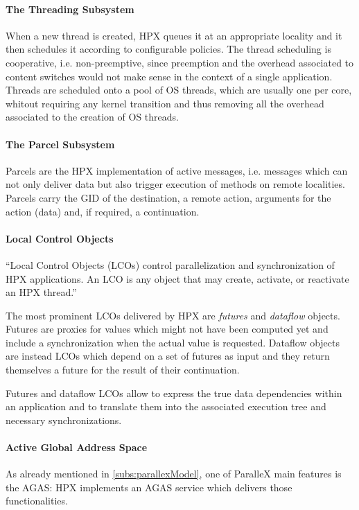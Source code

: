 \paragraph{The Threading Subsystem}
When a new thread is created, HPX queues it at an appropriate locality and it then schedules it according to configurable policies. The thread scheduling is cooperative, i.e. non-preemptive, since preemption and the overhead associated to content switches would not make sense in the context of a single application. Threads are scheduled onto a pool of OS threads, which are usually one per core, whitout requiring any kernel transition and thus removing all the overhead associated to the creation of OS threads.
~\\ 

\paragraph{The Parcel Subsystem}
Parcels are the HPX implementation of active messages, i.e. messages which can not only deliver data but also trigger execution of methods on remote localities.
Parcels carry the GID of the destination, a remote action, arguments for the action (data) and, if required, a continuation.
~\\ 

\paragraph{Local Control Objects}
``Local Control Objects (LCOs) control parallelization and synchronization of
HPX applications. An LCO is any object that may create, activate, or reactivate
an HPX thread.''\cite{grubel2016dynamic}

The most prominent LCOs delivered by HPX are \emph{futures} and \emph{dataflow} objects. Futures are proxies for values which might not have been computed yet and include a synchronization when the actual value is requested. Dataflow objects are instead LCOs which depend on a set of futures as input and they return themselves a future for the result of their continuation.

Futures and dataflow LCOs allow to express the true data dependencies within an application and to translate them into the associated execution tree and necessary synchronizations.
~\\ 

\paragraph{Active Global Address Space}
As already mentioned in \ref{subs:parallexModel}, one of ParalleX main features is the AGAS: HPX implements an AGAS service which delivers those functionalities.
~\\ 

